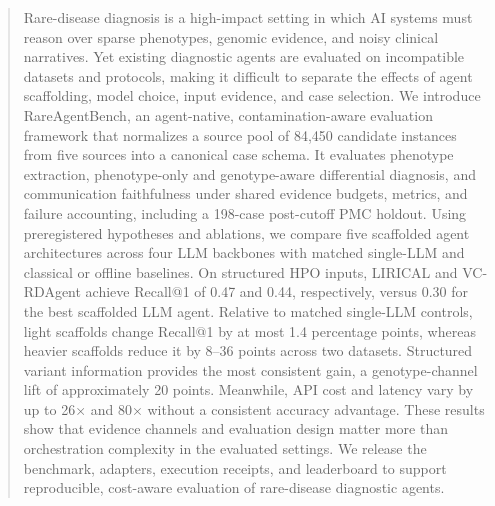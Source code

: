 \documentclass[letterpaper]{article} %
\begin{document}
\begin{abstract}
Rare-disease diagnosis is a high-impact setting in which AI systems must reason over sparse phenotypes, genomic evidence, and noisy clinical narratives. Yet existing diagnostic agents are evaluated on incompatible datasets and protocols, making it difficult to separate the effects of agent scaffolding, model choice, input evidence, and case selection. We introduce RareAgentBench, an agent-native, contamination-aware evaluation framework that normalizes a source pool of 84,450 candidate instances from five sources into a canonical case schema. It evaluates phenotype extraction, phenotype-only and genotype-aware differential diagnosis, and communication faithfulness under shared evidence budgets, metrics, and failure accounting, including a 198-case post-cutoff PMC holdout. Using preregistered hypotheses and ablations, we compare five scaffolded agent architectures across four LLM backbones with matched single-LLM and classical or offline baselines. On structured HPO inputs, LIRICAL and VC-RDAgent achieve Recall@1 of 0.47 and 0.44, respectively, versus 0.30 for the best scaffolded LLM agent. Relative to matched single-LLM controls, light scaffolds change Recall@1 by at most 1.4 percentage points, whereas heavier scaffolds reduce it by 8–36 points across two datasets. Structured variant information provides the most consistent gain, a genotype-channel lift of approximately 20 points. Meanwhile, API cost and latency vary by up to 26× and 80× without a consistent accuracy advantage. These results show that evidence channels and evaluation design matter more than orchestration complexity in the evaluated settings. We release the benchmark, adapters, execution receipts, and leaderboard to support reproducible, cost-aware evaluation of rare-disease diagnostic agents.
\end{abstract}


\end{document}
